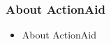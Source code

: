 
\begin{frame}

\frametitle{About ActionAid}

\begin{itemize}

\item About ActionAid

\end{itemize}




\end{frame}